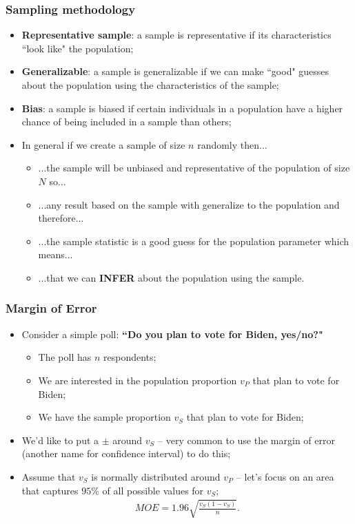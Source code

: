 \documentclass[aspectratio=169]{beamer}
\theoremstyle{principle}
\begin{document}
\begin{frame}
\frametitle{Sampling methodology}

\begin{itemize}
\item \textbf{Representative sample}: a sample is representative if its characteristics ``look like" the population;
\bigskip
\item \textbf{Generalizable}: a sample is generalizable if we can make ``good" guesses about the population using the characteristics of the sample;
\bigskip
\item \textbf{Bias}: a sample is biased if certain individuals in a population have a higher chance of being included in a sample than others;
\bigskip
\item In general if we create a sample of size $n$ randomly then...
\begin{itemize}
\item ...the sample will be unbiased and representative of the population of size $N$ so...
\item ...any result based on the sample with generalize to the population and therefore...
\item ...the sample statistic is a good guess for the population parameter which means...
\item ...that we can \textbf{INFER} about the population using the sample.
\end{itemize}
\end{itemize}

\end{frame}

\begin{frame}
\frametitle{Margin of Error}

\begin{itemize}
\item Consider a simple poll: \textbf{``Do you plan to vote for Biden, yes/no?"}
\begin{itemize}
\item The poll has $n$ respondents;
\item We are interested in the population proportion $v_P$ that plan to vote for Biden;
\item We have the sample proportion $v_S$ that plan to vote for Biden;
\end{itemize}
\bigskip

\item We'd like to put a $\pm$ around $v_S$ -- very common to use the margin of error (another name for confidence interval) to do this;
\bigskip
\bigskip

\item Assume that $v_S$ is normally distributed around $v_P$ -- let's focus on an area that captures $95\%$ of all possible values for $v_S$;
\begin{align*}
MOE = 1.96\sqrt{\frac{v_S(1-v_S)}{n}}.
\end{align*}
\end{itemize}

\end{frame}
\end{document}
